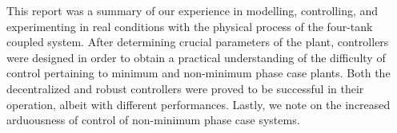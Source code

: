 This report was a summary of our experience in modelling, controlling, and
experimenting in real conditions with the physical process of the four-tank
coupled system. After determining crucial parameters of the plant, controllers
were designed in order to obtain a practical understanding of the difficulty
of control pertaining to minimum and non-minimum phase case plants. Both the
decentralized and robust controllers were proved to be successful in their
operation, albeit with different performances. Lastly, we note on the
increased arduousness of control of non-minimum phase case systems.
